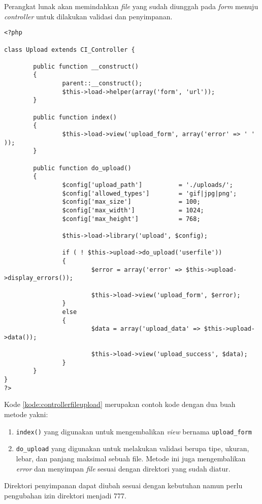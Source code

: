 Perangkat lunak akan memindahkan \textit{file} yang sudah diunggah pada \textit{form} menuju \textit{controller} untuk dilakukan validasi dan penyimpanan.

\begin{lstlisting}[caption=Contoh \textit{controller} untuk melakukan validasi dan penyimpanan, label=kode:controllerfileupload]
<?php

class Upload extends CI_Controller {

        public function __construct()
        {
                parent::__construct();
                $this->load->helper(array('form', 'url'));
        }

        public function index()
        {
                $this->load->view('upload_form', array('error' => ' ' ));
        }

        public function do_upload()
        {
                $config['upload_path']          = './uploads/';
                $config['allowed_types']        = 'gif|jpg|png';
                $config['max_size']             = 100;
                $config['max_width']            = 1024;
                $config['max_height']           = 768;

                $this->load->library('upload', $config);

                if ( ! $this->upload->do_upload('userfile'))
                {
                        $error = array('error' => $this->upload->display_errors());

                        $this->load->view('upload_form', $error);
                }
                else
                {
                        $data = array('upload_data' => $this->upload->data());

                        $this->load->view('upload_success', $data);
                }
        }
}
?>
\end{lstlisting}

Kode \ref{kode:controllerfileupload} merupakan contoh kode dengan dua buah metode yakni:
\begin{enumerate}
\item \verb|index()| yang digunakan untuk mengembalikan \textit{view} bernama \texttt{upload\_form}
\item \verb|do_upload| yang digunakan untuk melakukan validasi berupa tipe, ukuran, lebar, dan panjang maksimal sebuah file. Metode ini juga mengembalikan \textit{error} dan menyimpan \textit{file} sesuai dengan direktori yang sudah diatur.
\end{enumerate}
Direktori penyimpanan dapat diubah sesuai dengan kebutuhan namun perlu pengubahan izin direktori menjadi 777.

